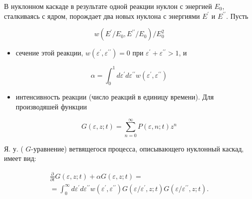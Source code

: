 \documentclass[10pt]{article}
\begin{document}
В нуклонном каскаде в результате одной реакции нуклон с энергией $E_{0}$, сталкиваясь с ядром, порождает два новых нуклона с энергиями $E^{\prime}$ и $E^{\prime \prime}$. Пусть



\[

w\left(E^{\prime} / E_{0}, E^{\prime \prime} / E_{0}\right) / E_{0}^{2}

\]



\begin{itemize}

  \item сечение этой реакции, $w\left(\varepsilon^{\prime}, \varepsilon^{\prime \prime}\right)=0$ при $\varepsilon^{\prime}+\varepsilon^{\prime \prime}>1$, и

\end{itemize}



\[

\alpha=\int_{0}^{1} d \varepsilon^{\prime} d \varepsilon^{\prime \prime} w\left(\varepsilon^{\prime}, \varepsilon^{\prime \prime}\right)

\]



\begin{itemize}

  \item интенсивность реакции (число реакций в единицу времени). Для производяшей функции

\end{itemize}



\[

G(\varepsilon, z ; t)=\sum_{n=0}^{\infty} P(\varepsilon, n ; t) z^{n}

\]



Я. у. ( $G$-уравнение) ветвящегося процесса, описывающего нуклонный каскад, имеет вид:



\[

\begin{gathered}

\frac{\partial}{\partial t} G(\varepsilon, z ; t)+\alpha G(\varepsilon, z ; t)= \\

=\int_{0}^{\infty} d \varepsilon^{\prime} d \varepsilon^{\prime \prime} w\left(\varepsilon^{\prime}, \varepsilon^{\prime \prime}\right) G\left(\varepsilon / \varepsilon^{\prime}, z ; t\right) G\left(\varepsilon / \varepsilon^{\prime \prime}, z ; t\right) .

\end{gathered}

\]
\end{document}
